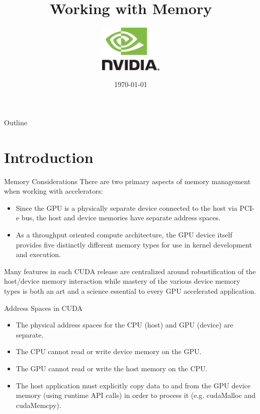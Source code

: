 \documentclass{beamer}
\title{Working with Memory}
\author{
    \includegraphics[width=3cm]{../media/logo/NVLogo_2D.eps}
    \vspace{0.75cm}
    \\}
\date{\today}
\begin{document}
\frame{\titlepage}

\begin{frame}{Outline}
\tableofcontents
\end{frame}



\section{Introduction}
\begin{frame}{Memory Considerations}
There are two primary aspects of memory management when working with accelerators:
\hfill\break
\begin{itemize}
\itemsep1em
    \item<1->Since the GPU is a physically separate device connected to the host via PCI-e bus, the host and device memories have separate address spaces.
    \item<1->As a throughput oriented compute architecture, the GPU device itself provides five distinctly different memory types for use in kernel development and execution.
\end{itemize}
\hfill\break
Many features in each CUDA release are centralized around robustification of the host/device memory interaction while mastery of the various device memory types is both an art and a science essential to every GPU accelerated application.
\end{frame}

\begin{frame}{Address Spaces in CUDA}
\begin{itemize}
\itemsep1em
    \item<1->The physical address spaces for the CPU (host) and GPU (device) are separate.
    \item<1->The CPU cannot read or write device memory on the GPU.
    \item<1->The GPU cannot read or write the host memory on the CPU.
    \item<1->The host application must explicitly copy data to and from the GPU device memory (using runtime API calls) in order to process it (e.g. {\selectfont cudaMalloc} and {\selectfont cudaMemcpy}).
\end{itemize}
\end{frame}
\end{document}
